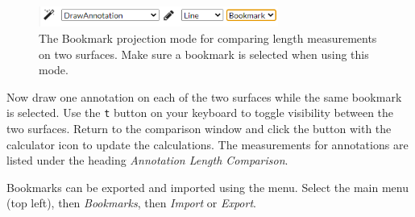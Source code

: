 \begin{figure}[h]
	\centering
	\includegraphics[width=0.7\textwidth]{pics/surfaceComparisonBookmarkMode.PNG}
	\caption[The Bookmark Projection Mode.]{The Bookmark projection mode for comparing length measurements on two surfaces. Make sure a bookmark is selected when using this mode.}
	\label{fig:surfaceComparisonBookmarkMode}
\end{figure}

Now draw one annotation on each of the two surfaces while the same bookmark is selected. Use the \texttt{t} button on your keyboard to toggle visibility between the two surfaces. Return to the comparison window and click the button with the calculator icon to update the calculations. The measurements for annotations are listed under the heading \emph{Annotation Length Comparison}.

Bookmarks can be exported and imported using the menu. Select the main menu (top left), then \emph{Bookmarks}, then \emph{Import} or \emph{Export}.
